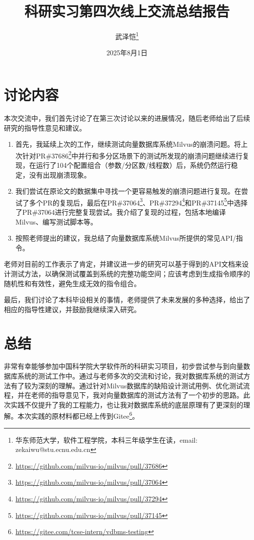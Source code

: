 \documentclass[UTF8]{ctexart}
\title{\heiti 科研实习第四次线上交流总结报告}
\author{武泽恺\footnote{华东师范大学，软件工程学院，本科三年级学生在读，email: zekaiwu@stu.ecnu.edu.cn}}
\date{2025年8月1日}
\begin{document}
\maketitle

\section{讨论内容}

本次交流中，我们首先讨论了在第三次讨论以来的进展情况，随后老师给出了后续研究的指导性意见和建议。

\begin{enumerate}[noitemsep, topsep=0pt]
    \item 首先，我延续上次的工作，继续测试向量数据库系统Milvus的崩溃问题。将上次针对PR\#37686\footnote{\url{https://github.com/milvus-io/milvus/pull/37686}}中并行和多分区场景下的测试所发现的崩溃问题继续进行复现，在运行了104个配置组合（参数/分区数/线程数）后，系统仍然运行稳定，没有出现崩溃现象。
    \item 我们尝试在原论文的数据集中寻找一个更容易触发的崩溃问题进行复现。在尝试了多个PR的复现后，最后在PR\#37064\footnote{\url{https://github.com/milvus-io/milvus/pull/37064}}、PR\#37294\footnote{\url{https://github.com/milvus-io/milvus/pull/37294}}和PR\#37145\footnote{\url{https://github.com/milvus-io/milvus/pull/37145}}中选择了PR\#37064进行完整复现尝试。我介绍了复现的过程，包括本地编译Milvus、编写测试脚本等。
    \item 按照老师提出的建议，我总结了向量数据库系统Milvus所提供的常见API/指令。
\end{enumerate}

老师对目前的工作表示了肯定，并建议进一步的研究可以基于得到的API文档来设计测试方法，以确保测试覆盖到系统的完整功能空间；应该考虑到生成指令顺序的随机性和有效性，避免生成无效的指令组合。

最后，我们讨论了本科毕设相关的事情，老师提供了未来发展的多种选择，给出了相应的指导性建议，并鼓励我继续深入研究。

\section{总结}

非常有幸能够参加中国科学院大学软件所的科研实习项目，初步尝试参与到向量数据库系统的测试工作中。通过与老师多次的交流和讨论，我对数据库系统的测试方法有了较为深刻的理解。通过针对Milvus数据库的缺陷设计测试用例、优化测试流程，并在老师的指导意见下，我对向量数据库的测试方法有了一个初步的思路。此次实践不仅提升了我的工程能力，也让我对数据库系统的底层原理有了更深刻的理解。本次实践的原材料都已经上传到Gitee\footnote{\url{https://gitee.com/tcse-intern/vdbms-testing}}。
\end{document}
